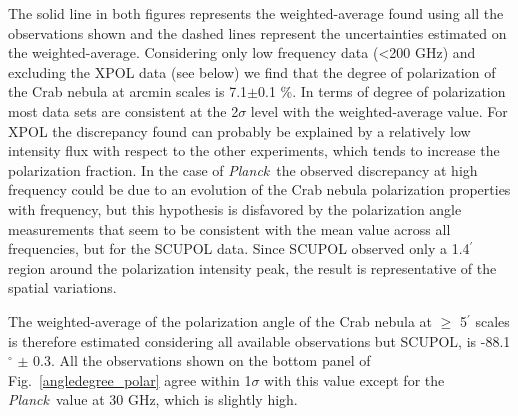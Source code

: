 \documentclass[twocolumn,traditabstract]{aa}
\def\Planck{\textit{Planck}}
\begin{document}
The solid line in both figures represents the weighted-average found using all
the observations shown and the dashed lines represent the uncertainties
estimated on the weighted-average. Considering only low frequency data
(\textless 200 GHz) and excluding the XPOL data (see below) we find that the
degree of polarization of the Crab nebula at arcmin scales is 7.1$\pm$0.1 \%.
In terms of degree of polarization most data sets are consistent at the
2$\sigma$ level with the weighted-average value. For XPOL the discrepancy found
can probably be explained by a relatively low intensity flux with respect to the
other experiments, which tends to increase the polarization fraction. In the
case of \Planck\, the observed discrepancy at high frequency could be due to an
evolution of the Crab nebula polarization properties with frequency, but
this hypothesis is disfavored by the polarization angle measurements that seem
to be consistent with the mean value across all frequencies, but for the SCUPOL
data. Since SCUPOL observed only a 1.4$^\prime$ region around the polarization intensity peak, the result is representative of the spatial variations.  

The weighted-average of the polarization angle of the Crab nebula at $\geq$ 5$^{\prime}$ scales is therefore estimated considering all available observations but SCUPOL, is -88.1$^{\circ}$
$\pm$ 0.3.  All the observations shown on the bottom panel of
Fig.~\ref{angledegree_polar} agree within 1$\sigma$ with this value except for
the \Planck\ value at 30 GHz, which is slightly high.
\end{document}
